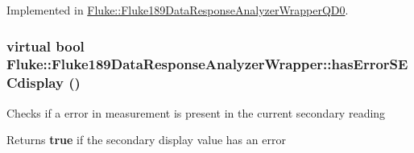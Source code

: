 Implemented in \hyperlink{classFluke_1_1Fluke189DataResponseAnalyzerWrapperQD0_a173f4602b71d7d415e11aa1f1826d3f0}{Fluke::Fluke189DataResponseAnalyzerWrapperQD0}.\hypertarget{classFluke_1_1Fluke189DataResponseAnalyzerWrapper_a99952a4552f0cb6705996b28312850dc}{
\subsubsection[{hasErrorSECdisplay}]{\setlength{\rightskip}{0pt plus 5cm}virtual bool Fluke::Fluke189DataResponseAnalyzerWrapper::hasErrorSECdisplay ()}}
\label{classFluke_1_1Fluke189DataResponseAnalyzerWrapper_a99952a4552f0cb6705996b28312850dc}
Checks if a error in measurement is present in the current secondary reading \begin{DoxyReturn}{Returns}
{\bfseries true} if the secondary display value has an error 
\end{DoxyReturn}


